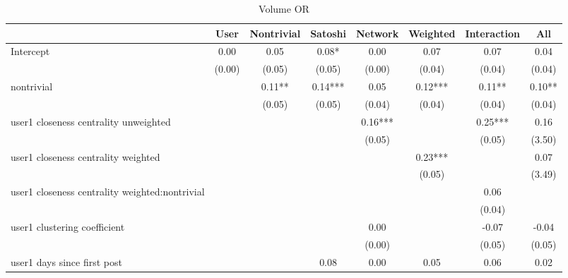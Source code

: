 \begin{table*}
\centering
\caption{Volume OR}
\begin{center}
\begin{tabular}{lccccccc}
\hline
                                               & User    & Nontrivial & Satoshi & Network & Weighted & Interaction &  All    \\
\hline
\hline

Intercept                                      & 0.00     & 0.05       & 0.08*   & 0.00    & 0.07     & 0.07               & 0.04    \\
                                               & (0.00)   & (0.05)     & (0.05)  & (0.00)  & (0.04)   & (0.04)             & (0.04)  \\
nontrivial                                     &          & 0.11**     & 0.14*** & 0.05    & 0.12***  & 0.11**             & 0.10**  \\
                                               &          & (0.05)     & (0.05)  & (0.04)  & (0.04)   & (0.04)             & (0.04)  \\
user1 closeness centrality unweighted          &          &            &         & 0.16*** &          & 0.25***            & 0.16    \\
                                               &          &            &         & (0.05)  &          & (0.05)             & (3.50)  \\
user1 closeness centrality weighted            &          &            &         &         & 0.23***  &                    & 0.07    \\
                                               &          &            &         &         & (0.05)   &                    & (3.49)  \\
user1 closeness centrality weighted:nontrivial &          &            &         &         &          & 0.06               &         \\
                                               &          &            &         &         &          & (0.04)             &         \\
user1 clustering coefficient                   &          &            &         & 0.00    &          & -0.07              & -0.04   \\
                                               &          &            &         & (0.00)  &          & (0.05)             & (0.05)  \\
user1 days since first post                    &          &            & 0.08    & 0.00    & 0.05     & 0.06               & 0.02    \\

\end{tabular}
\end{center}
\end{table*}
